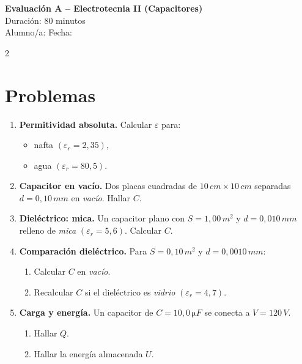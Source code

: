 \documentclass[a4paper,10pt]{article}
\begin{document}
\begin{center}
    \Large \textbf{Evaluación A – Electrotecnia II (Capacitores)} \\
    \normalsize Duración: 80 minutos \\
    Alumno/a: \underline{\hspace{6cm}} \hspace{0.5cm} Fecha: \underline{\hspace{2cm}}
\end{center}

\vspace{0.3cm}


\vspace{0.2cm}

\begin{multicols}{2}

\section*{Problemas}

\begin{enumerate}
\item \textbf{Permitividad absoluta.} Calcular \(\varepsilon\) para:
\begin{itemize}
\item nafta \(\left(\varepsilon_r=2{,}35\right)\),
\item agua \(\left(\varepsilon_r=80{,}5\right)\).
\end{itemize}

\item \textbf{Capacitor en vacío.} Dos placas cuadradas de \(10\,\si{cm}\times 10\,\si{cm}\) separadas \(d=0{,}10\,\si{mm}\) en \textit{vacío}. Hallar \(C\).

\item \textbf{Dieléctrico: mica.} Un capacitor plano con \(S=1{,}00\,\si{m^2}\) y \(d=0{,}010\,\si{mm}\) relleno de \textit{mica} \(\left(\varepsilon_r=5{,}6\right)\). Calcular \(C\).

\item \textbf{Comparación dieléctrico.} Para \(S=0{,}10\,\si{m^2}\) y \(d=0{,}0010\,\si{mm}\):
\begin{enumerate}
\item Calcular \(C\) en \textit{vacío}.
\item Recalcular \(C\) si el dieléctrico es \textit{vidrio} \(\left(\varepsilon_r=4{,}7\right)\).
\end{enumerate}

\item \textbf{Carga y energía.} Un capacitor de \(C=10{,}0\,\si{\micro F}\) se conecta a \(V=120\,\si{V}\).
\begin{enumerate}
\item Hallar \(Q\).
\item Hallar la energía almacenada \(U\).
\end{enumerate}


\end{enumerate}
\end{multicols}
\end{document}
